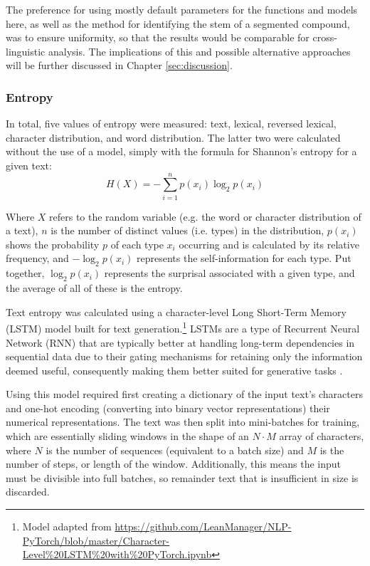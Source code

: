 \documentclass[12pt,a4paper]{article}
\numberwithin{figure}{section}
\numberwithin{table}{section}
\numberwithin{definition}{section}
\begin{document}
The preference for using mostly default parameters for the functions and models here, as well as the method for identifying the stem of a segmented compound, was to ensure uniformity, so that the results would be comparable for cross-linguistic analysis. The implications of this and possible alternative approaches will be further discussed in Chapter \ref{sec:discussion}.

\subsubsection{Entropy}
\label{ssec:entropy}

In total, five values of entropy were measured: text, lexical, reversed lexical, character distribution, and word distribution. The latter two were calculated without the use of a model, simply with the formula for Shannon's entropy for a given text: \[H(X) = -\sum_{i=1}^{n}p(x_i)\log_{2}p(x_i)\]

Where \( X \) refers to the random variable (e.g. the word or character distribution of a text), \( n \) is the number of distinct values (i.e. types) in the distribution, \( p(x_i) \) shows the probability \( p \) of each type \( x_i \) occurring and is calculated by its relative frequency, and \( -\log_{2}p(x_i) \) represents the self-information for each type. Put together, \( \log_{2}p(x_i) \) represents the surprisal associated with a given type, and the average of all of these is the entropy.


Text entropy was calculated using a character-level Long Short-Term Memory (LSTM) model built for text generation.\footnote{Model adapted from \url{https://github.com/LeanManager/NLP-PyTorch/blob/master/Character-Level\%20LSTM\%20with\%20PyTorch.ipynb}} LSTMs are a type of Recurrent Neural Network (RNN) that are typically better at handling long-term dependencies in sequential data due to their gating mechanisms for retaining only the information deemed useful, consequently making them better suited for generative tasks \parencite{Dhandapani2023inbook}.

Using this model required first creating a dictionary of the input text's characters and one-hot encoding (converting into binary vector representations) their numerical representations. The text was then split into mini-batches for training, which are essentially sliding windows in the shape of an \( N \cdot M \) array of characters, where \( N \) is the number of sequences (equivalent to a batch size) and \( M \) is the number of steps, or length of the window. Additionally, this means the input must be divisible into full batches, so remainder text that is insufficient in size is discarded.
\end{document}
